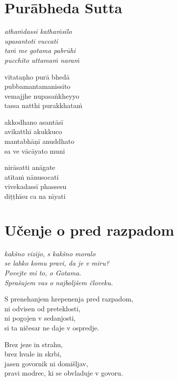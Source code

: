 

\cleartoverso
\chapter*{Purābheda Sutta}

\emph{athaṁdassī kathaṁsīlo\\
upasantoti vuccati\\
taṁ me gotama pabrūhi\\
pucchito uttamaṁ naraṁ}

vītataṇho purā bhedā\\
pubbamantamanissito\\
vemajjhe nupasaṅkheyyo\\
tassa natthi purakkhataṁ

akkodhano asantāsī\\
avikatthī akukkuco\\
mantabhāṇī anuddhato\\
sa ve vācāyato muni

nirāsatti anāgate\\
atītaṁ nānusocati\\
vivekadassī phassesu\\
diṭṭhīsu ca na nīyati


\cleartorecto
\chapter{Učenje o pred razpadom}

\emph{kakšno vizijo, s kakšno moralo\\
se lahko komu pravi, da je v miru?\\
Povejte mi to, o Gotama.\\
Sprašujem vas o najboljšem človeku.}

S prenehanjem hrepenenja pred razpadom,\\
ni odvisen od preteklosti,\\
ni pogojen v sedanjosti,\\
si ta ničesar ne daje v ospredje.

Brez jeze in strahu,\\
brez hvale in skrbi,\\
jasen govornik ni domišljav,\\
pravi modrec, ki se obvladuje v govoru.

